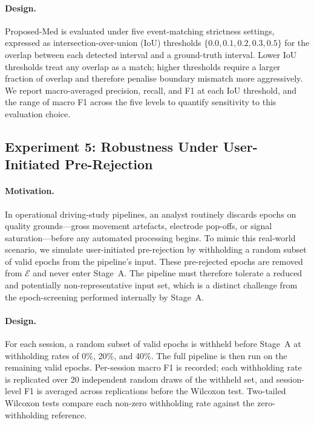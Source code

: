 \paragraph{Design.}
Proposed-Med is evaluated under five event-matching strictness settings, expressed
as intersection-over-union (IoU) thresholds $\{0.0, 0.1, 0.2, 0.3, 0.5\}$ for the
overlap between each detected interval and a ground-truth interval.
Lower IoU thresholds treat any overlap as a match; higher thresholds require a
larger fraction of overlap and therefore penalise boundary mismatch more
aggressively.
We report macro-averaged precision, recall, and F1 at each IoU threshold, and the
range of macro F1 across the five levels to quantify sensitivity to this
evaluation choice.

\subsection{Experiment 5: Robustness Under User-Initiated Pre-Rejection}
\label{sec:exp8}

\paragraph{Motivation.}
In operational driving-study pipelines, an analyst routinely discards epochs
on quality grounds---gross movement artefacts, electrode pop-offs, or signal
saturation---before any automated processing begins.
To mimic this real-world scenario, we simulate user-initiated pre-rejection by
withholding a random subset of valid epochs from the pipeline's input.
These pre-rejected epochs are removed from $\mathcal{E}$ and never enter Stage~A.
The pipeline must therefore tolerate a reduced and potentially non-representative
input set, which is a distinct challenge from the epoch-screening performed
internally by Stage~A.

\paragraph{Design.}
For each session, a random subset of valid epochs is withheld before Stage~A
at withholding rates of 0\%, 20\%, and 40\%.
The full pipeline is then run on the remaining valid epochs.
Per-session macro F1 is recorded; each withholding rate is replicated over
20 independent random draws of the withheld set, and session-level F1 is
averaged across replications before the Wilcoxon test.
Two-tailed Wilcoxon tests compare each non-zero withholding rate against the
zero-withholding reference.

